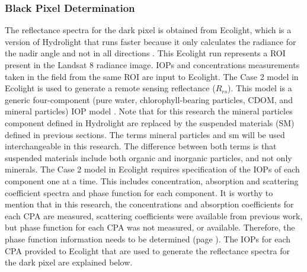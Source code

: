\subsubsection{Black Pixel Determination}
\label{subsubsec:blackpixel}
The reflectance spectra for the dark pixel is obtained from Ecolight, which is a version of Hydrolight that runs faster because it only calculates the radiance for the nadir angle and not in all directions \citep{MobleyHEtech}. This Ecolight run represents a ROI present in the Landsat 8 radiance image. IOPs and concentrations measurements taken in the field from the same ROI are input to Ecolight. The Case 2 model in Ecolight is used to generate a remote sensing reflectance ($R_{rs}$). This model is a generic four-component (pure water, chlorophyll-bearing particles, CDOM, and mineral particles) IOP model \citep{MobleyHEtech}. Note that for this research the mineral particles component defined in Hydrolight are replaced by the suspended materials (SM) defined in previous sections. The terms mineral particles and \gls{sm} will be used interchangeable in this research. The difference between both terms is that suspended materials include both organic and inorganic particles, and not only minerals. The Case 2 model in Ecolight requires specification of the IOPs of each component one at a time. This includes concentration, absorption and scattering coefficient spectra and phase function for each component. It is worthy to mention that in this research, the concentrations and absorption coefficients for each CPA are measured, scattering coefficients were available from previous work, but phase function for each CPA was not measured, or available. Therefore, the phase function information needs to be determined (page \pageref{pag:phasefn}). The IOPs for each CPA provided to Ecolight that are used to generate the reflectance spectra for the dark pixel are explained below.

